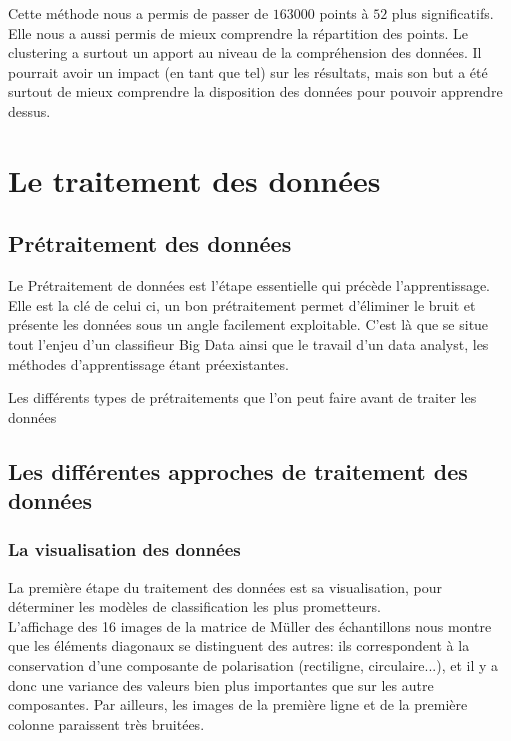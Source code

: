 \documentclass[a4paper,10pt]{report}
\begin{document}
Cette méthode nous a permis de passer de $163 000$ points à $52$ plus significatifs. Elle nous a aussi permis de mieux comprendre la répartition des points. Le clustering a surtout un apport au niveau de la compréhension des données. Il pourrait avoir un impact (en tant que tel) sur les résultats, mais son but a été surtout de mieux comprendre la disposition des données pour pouvoir apprendre dessus.
\chapter{Le traitement des données}

\section{Prétraitement des données}
Le Prétraitement de données est l'étape essentielle qui précède l'apprentissage. Elle est la clé de celui ci, un bon prétraitement permet d'éliminer le bruit et présente les données sous un angle facilement exploitable. C'est là que se situe tout l'enjeu d'un classifieur Big Data ainsi que le travail d'un data analyst, les méthodes d'apprentissage étant préexistantes.  

Les différents types de prétraitements que l'on peut faire avant de traiter les données
\section{Les différentes approches de traitement des données}

\subsection{La visualisation des données}

La première étape du traitement des données est sa visualisation, pour déterminer les modèles de classification les plus prometteurs.\\

L'affichage des 16 images de la matrice de Müller des échantillons nous montre que les éléments diagonaux se distinguent des autres: ils correspondent à la conservation d'une composante de polarisation (rectiligne, circulaire...), et il y a donc une variance des valeurs bien plus importantes que sur les autre composantes. Par ailleurs, les images de la première ligne et de la première colonne paraissent très bruitées. 
\end{document}
